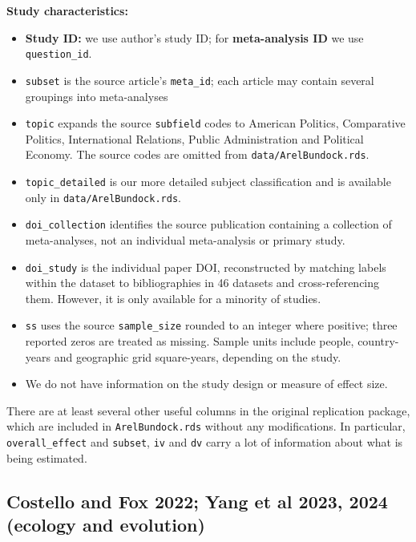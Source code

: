 \documentclass[
  11pt,
]{article}
\providecommand{\tightlist}{%
  \setlength{\itemsep}{0pt}\setlength{\parskip}{0pt}}
\begin{document}
\textbf{Study characteristics:}

\begin{itemize}
\tightlist
\item
  \textbf{Study ID:} we use author's study ID; for \textbf{meta-analysis ID} we use \texttt{question\_id}.
\item
  \texttt{subset} is the source article's \texttt{meta\_id}; each article may contain several
  groupings into meta-analyses
\item
  \texttt{topic} expands the source \texttt{subfield} codes to American Politics,
  Comparative Politics, International Relations, Public Administration and
  Political Economy. The source codes are omitted from \texttt{data/ArelBundock.rds}.
\item
  \texttt{topic\_detailed} is our more detailed subject classification and is
  available only in \texttt{data/ArelBundock.rds}.
\item
  \texttt{doi\_collection} identifies the source publication containing a collection
  of meta-analyses, not an individual meta-analysis or primary study.
\item
  \texttt{doi\_study} is the individual paper DOI, reconstructed by matching labels within
  the dataset to bibliographies in 46 datasets and cross-referencing them.
  However, it is only available for a minority of studies.
\item
  \texttt{ss} uses the source \texttt{sample\_size} rounded to an integer where positive;
  three reported zeros are treated as missing. Sample units include people,
  country-years and geographic grid square-years, depending on the study.
\item
  We do not have information on the study design or measure of effect size.
\end{itemize}

There are at least several other useful columns in the original replication
package, which are included in \texttt{ArelBundock.rds} without any modifications.
In particular, \texttt{overall\_effect} and \texttt{subset}, \texttt{iv} and \texttt{dv} carry a lot of
information about what is being estimated.

\newpage

\subsection{Costello and Fox 2022; Yang et al 2023, 2024 (ecology and
evolution)}\label{costello-and-fox-2022-yang-et-al-2023-2024-ecology-and-evolution}
\end{document}
